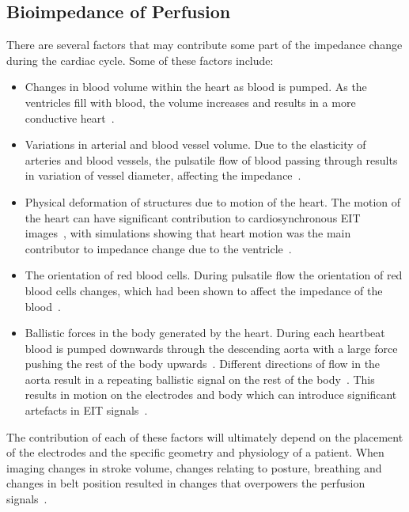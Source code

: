 \subsection{Bioimpedance of Perfusion} \label{sec:origins}
There are several factors that may contribute some part of 
the impedance change during the cardiac cycle. 
Some of these factors include:
\begin{itemize}
    \item Changes in blood volume within the heart as blood is pumped. As the ventricles 
          fill with blood,
          the volume increases and results in a more conductive
          heart~\parencite{nyboer_impedance_1970}.
    \item Variations in arterial and blood vessel volume. Due to the elasticity of arteries 
          and
          blood vessels, the pulsatile flow of blood passing through results in variation of 
          vessel diameter, affecting the impedance~\parencite{eyuboglu_localisation_1987}.
    \item Physical deformation of structures due to motion of the heart. The
          motion of the heart can have significant contribution 
          to cardiosynchronous EIT 
          images~\parencite{proenca_influence_2015,adler_origins_2017}, 
          with simulations showing that heart motion was the 
          main contributor to impedance change due to the 
          ventricle~\parencite{proenca_influence_2015}. 
    \item The orientation of red blood cells. During pulsatile flow the orientation of
          red blood cells changes, which had been shown to affect the impedance of the 
          blood~\parencite{gaw_effect_2010}. 
    \item Ballistic forces in the body generated by the heart. During each
          heartbeat blood is pumped downwards through the descending
          aorta with a large force pushing the rest of the body 
          upwards~\parencite{gordon_certain_1877}. Different directions 
          of flow in the aorta result in a repeating ballistic 
          signal on the rest of the body~\parencite{kim_ballistocardiogram_2016}. This results in 
          motion on the electrodes and body which can introduce significant
          artefacts in EIT signals~\parencite{adler_impedance_1994}.
\end{itemize}

The contribution of each of these factors will ultimately depend on the placement
of the electrodes and the specific geometry and physiology of a patient. 
When imaging changes in stroke volume, changes 
relating to posture, breathing and changes in belt 
position resulted in  changes that overpowers the 
perfusion signals~\parencite{patterson_variability_2001}.  

